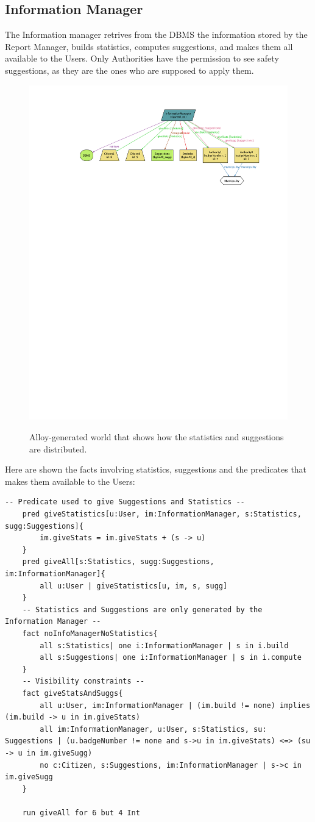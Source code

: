 \documentclass{report}
\begin{document}
\subsection{Information Manager}
The Information manager retrives from the DBMS the information stored by the Report Manager, builds statistics, computes suggestions, and makes them all available to the Users. Only Authorities have the permission to see safety suggestions, as they are the ones who are supposed to apply them.\vfill
\begin{figure}[ht!]
	\begin{center}
	\includegraphics[width=.8\textwidth]{./img/giveAll.pdf}
	\label{fig:allgive}
	\caption{Alloy-generated world that shows how the statistics and suggestions are distributed.}
	\end{center}
\end{figure}
\noindent Here are shown the facts involving statistics, suggestions and the predicates that makes them available to the Users:
\begin{lstlisting}[language=alloy]
	-- Predicate used to give Suggestions and Statistics --
	pred giveStatistics[u:User, im:InformationManager, s:Statistics, sugg:Suggestions]{
		im.giveStats = im.giveStats + (s -> u)
	}
	pred giveAll[s:Statistics, sugg:Suggestions, im:InformationManager]{
		all u:User | giveStatistics[u, im, s, sugg]
	}
	-- Statistics and Suggestions are only generated by the Information Manager --
	fact noInfoManagerNoStatistics{
		all s:Statistics| one i:InformationManager | s in i.build 
		all s:Suggestions| one i:InformationManager | s in i.compute
	}
	-- Visibility constraints --
	fact giveStatsAndSuggs{
		all u:User, im:InformationManager | (im.build != none) implies (im.build -> u in im.giveStats)
		all im:InformationManager, u:User, s:Statistics, su: Suggestions | (u.badgeNumber != none and s->u in im.giveStats) <=> (su -> u in im.giveSugg)
		no c:Citizen, s:Suggestions, im:InformationManager | s->c in im.giveSugg
	}

	run giveAll for 6 but 4 Int
\end{lstlisting}
\end{document}

